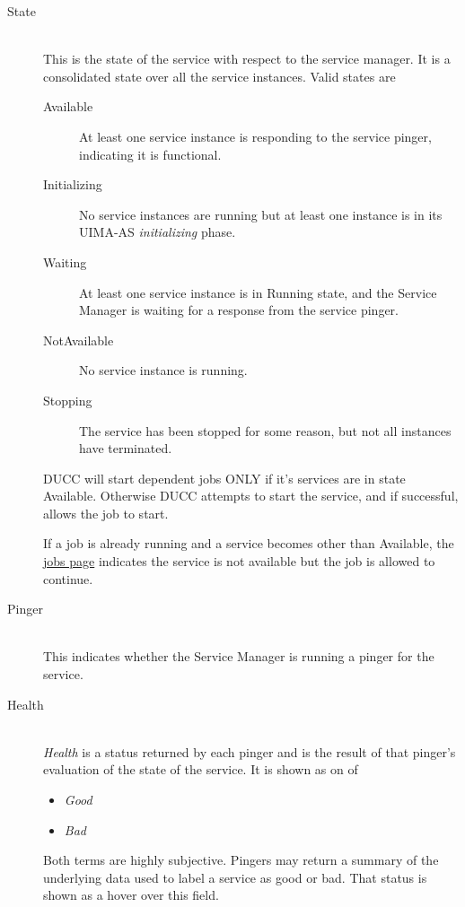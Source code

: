 \begin{description}
            \item[State] \hfill \\
              This is the state of the service with respect to the service manager.  It is a
              consolidated state over all the service instances.  Valid states are
              \begin{description}
                \item[Available] At least one service instance is responding to the service
                  pinger, indicating it is functional.
                \item[Initializing] No service instances are running but at least one instance
                  is in its UIMA-AS {\em initializing} phase.
                \item[Waiting] At least one service instance is in Running state, and the Service
                  Manager is waiting for a response from the service pinger.
                \item[NotAvailable] No service instance is running. 
                \item[Stopping] The service has been stopped for some reason, but not all 
                  instances have terminated.
              \end{description}

              DUCC will start dependent jobs ONLY if it's services are in state Available.  Otherwise
              DUCC attempts to start the service, and if successful, allows the job to start.  

              If a job is already running and a service becomes other than Available, the
              \hyperref[sec:ws.jobs-page]{jobs page} indicates the service is not available but the job is 
              allowed to continue.
              
            \item[Pinger] \hfill \\
              This indicates whether the Service Manager is running a pinger for the service.
              
            \item[Health] \hfill \\
              {\em Health} is a status returned by each pinger and is the result of that pinger's
              evaluation of the state of the service.  It is shown as on of
              \begin{itemize}
                \item {\em Good}
                \item {\em Bad}
              \end{itemize}
              Both terms are highly subjective.  Pingers may return a summary of the underlying
              data used to label a service as good or bad.  That status is shown as a hover over
              this field.
              

\end{description}
